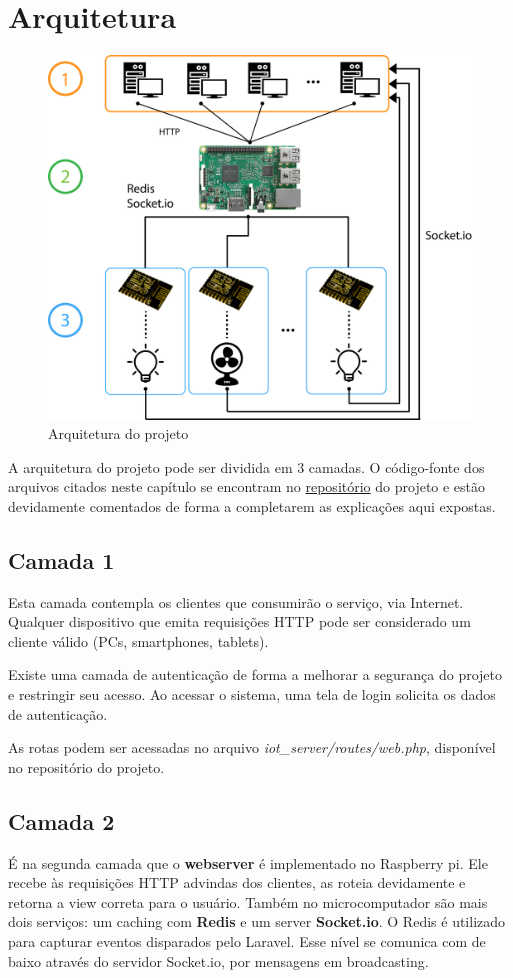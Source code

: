 \documentclass[
12pt,				%
openany,			%
twoside,			%
a4paper,			%
english,			%
french,				%
spanish,			%
brazil,				%
]{abntex2}
\begin{document}
\chapter{Arquitetura}
\begin{figure}[ht!]
    \includegraphics[width=450pt]{images/architeture.png}
    \caption{Arquitetura do projeto}
\end{figure}

A arquitetura do projeto pode ser dividida em 3 camadas. O código-fonte dos arquivos citados neste capítulo se encontram no \href{https://github.com/GabrielMMelo/iot\_server}{repositório} do projeto e estão devidamente comentados de forma a completarem  as explicações aqui expostas.

\section{Camada 1}
Esta camada contempla os clientes que consumirão o serviço, via Internet. Qualquer dispositivo que emita requisições HTTP pode ser considerado um cliente válido (PCs, smartphones, tablets).

Existe uma camada de autenticação de forma a melhorar a segurança do projeto e restringir seu acesso. Ao acessar o sistema, uma tela de login solicita os dados de autenticação.

As rotas podem ser acessadas no arquivo \textit{iot\_server/routes/web.php}, disponível no repositório do projeto.

\section{Camada 2}
É na segunda camada que o \textbf{webserver} é implementado no Raspberry pi. Ele recebe às requisições HTTP advindas dos clientes, as roteia devidamente e retorna a view correta para o usuário. Também no microcomputador são mais dois serviços: um caching com \textbf{Redis} e um server \textbf{Socket.io}. O Redis é utilizado para capturar eventos disparados pelo Laravel. Esse nível se comunica com de baixo através do servidor Socket.io, por mensagens em broadcasting.
\end{document}
